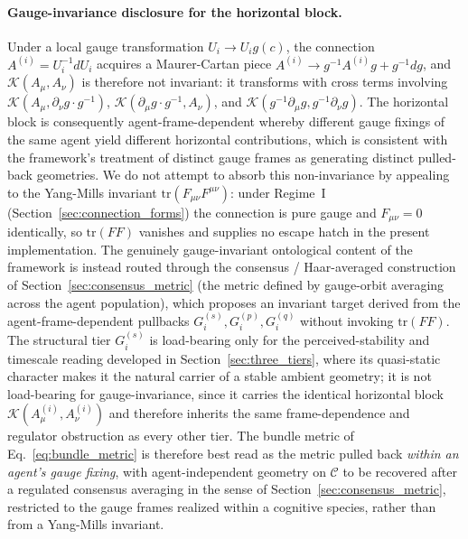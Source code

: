 \documentclass[11pt]{article}
\begin{document}
\paragraph{Gauge-invariance disclosure for the horizontal block.}
Under a local gauge transformation $U_i \to U_i g(c)$, the connection $A^{(i)} = U_i^{-1} dU_i$ acquires a Maurer-Cartan piece $A^{(i)} \to g^{-1} A^{(i)} g + g^{-1} dg$, and $\mathcal{K}(A_\mu, A_\nu)$ is therefore not invariant: it transforms with cross terms involving $\mathcal{K}(A_\mu, \partial_\nu g \cdot g^{-1})$, $\mathcal{K}(\partial_\mu g \cdot g^{-1}, A_\nu)$, and $\mathcal{K}(g^{-1} \partial_\mu g, g^{-1} \partial_\nu g)$. The horizontal block is consequently agent-frame-dependent whereby different gauge fixings of the same agent yield different horizontal contributions, which is consistent with the framework's treatment of distinct gauge frames as generating distinct pulled-back geometries. We do not attempt to absorb this non-invariance by appealing to the Yang-Mills invariant $\mathrm{tr}(F_{\mu\nu} F^{\mu\nu})$: under Regime~I (Section~\ref{sec:connection_forms}) the connection is pure gauge and $F_{\mu\nu} = 0$ identically, so $\mathrm{tr}(FF)$ vanishes and supplies no escape hatch in the present implementation. The genuinely gauge-invariant ontological content of the framework is instead routed through the consensus / Haar-averaged construction of Section~\ref{sec:consensus_metric} (the metric defined by gauge-orbit averaging across the agent population), which proposes an invariant target derived from the agent-frame-dependent pullbacks $G_i^{(s)}, G_i^{(p)}, G_i^{(q)}$ without invoking $\mathrm{tr}(FF)$. The structural tier $G_i^{(s)}$ is load-bearing only for the perceived-stability and timescale reading developed in Section~\ref{sec:three_tiers}, where its quasi-static character makes it the natural carrier of a stable ambient geometry; it is not load-bearing for gauge-invariance, since it carries the identical horizontal block $\mathcal{K}(A^{(i)}_\mu, A^{(i)}_\nu)$ and therefore inherits the same frame-dependence and regulator obstruction as every other tier. The bundle metric of Eq.~\eqref{eq:bundle_metric} is therefore best read as the metric pulled back \emph{within an agent's gauge fixing}, with agent-independent geometry on $\mathcal{C}$ to be recovered after a regulated consensus averaging in the sense of Section~\ref{sec:consensus_metric}, restricted to the gauge frames realized within a cognitive species, rather than from a Yang-Mills invariant.
\end{document}
